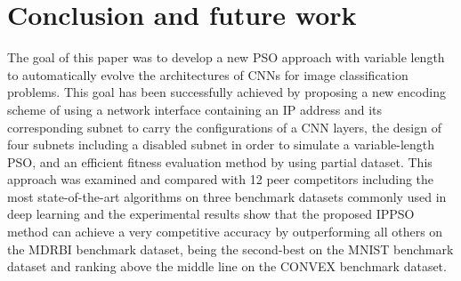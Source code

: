 \documentclass[conference]{IEEEtran}
\begin{document}
%






\section{Conclusion and future work}\label{sec:Conclusion}

The goal of this paper was to develop a new PSO approach with variable length to automatically evolve the architectures of CNNs for image classification problems. This goal has been successfully achieved by proposing a new encoding scheme of using a network interface containing an IP address and its corresponding subnet to carry the configurations of a CNN layers, the design of four subnets including a disabled subnet in order to simulate a variable-length PSO, and an efficient fitness evaluation method by using partial dataset. This approach was examined and compared with 12 peer competitors including the most state-of-the-art algorithms on three benchmark datasets commonly used in deep learning and the experimental results show that the proposed IPPSO method can achieve a very competitive accuracy by outperforming all others on the MDRBI benchmark dataset, being the second-best on the MNIST benchmark dataset and ranking above the middle line on the CONVEX benchmark dataset. 
\end{document}
